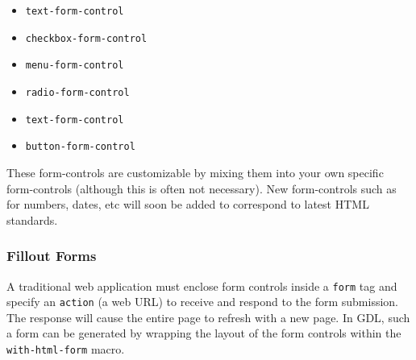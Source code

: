 \documentclass [11pt]{book}
\begin{document}
\begin{itemize}

\item \texttt{text-form-control}

\item \texttt{checkbox-form-control}

\item \texttt{menu-form-control}

\item \texttt{radio-form-control}

\item \texttt{text-form-control}

\item \texttt{button-form-control}

\end{itemize}





These form-controls are customizable by mixing them into
	   your own specific form-controls (although this is often not
	   necessary). New form-controls such as for numbers, dates,
	   etc will soon be added to correspond to latest HTML
	   standards.



\subsubsection{Fillout Forms}

\label{subsubsec:filloutforms}



A traditional web application must enclose form controls inside a \texttt{form} tag and specify an \texttt{action} (a web URL) to receive and respond to the 
form submission. The response will cause the entire page to refresh with
a new page. In GDL, such a form can be generated by wrapping the layout
of the form controls within the \texttt{with-html-form} macro.
\end{document}
